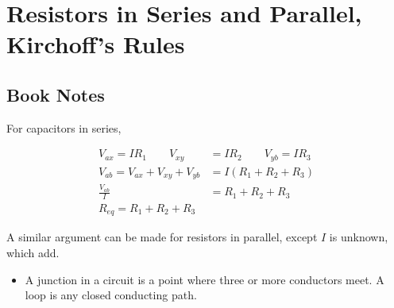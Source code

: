 \documentclass[11pt]{article}
\newcommand{\chapterTitle}{Resistors in Series and Parallel, Kirchoff's Rules}
\begin{document}
\section{\chapterTitle}

\subsection{Book Notes}
For capacitors in series,

\begin{align}
    V_{ax} = IR_1 \quad\quad V_{xy} &= IR_2 \quad\quad V_{yb} = IR_3 \\
    V_{ab} = V_{ax} + V_{xy} + V_{yb} &= I(R_1 + R_2 + R_3) \\
    \frac{V_{ab}}{I} &= R_1 + R_2 + R_3 \\
    R_{eq} = R_1 + R_2 + R_3
\end{align}

A similar argument can be made for resistors in parallel, except $I$ is unknown, which add.

\begin{itemize}
    \item A junction in a circuit is a point where three or more conductors meet. A loop is any closed conducting path.
\end{itemize}
\end{document}
